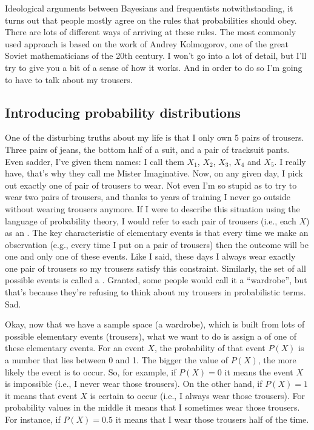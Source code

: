 Ideological arguments between Bayesians and frequentists notwithstanding, it turns out that people mostly agree on the rules that probabilities should obey. There are lots of different ways of arriving at these rules. The most commonly used approach is based on the work of Andrey Kolmogorov, one of the great Soviet mathematicians of the 20th century. I won't go into a lot of detail, but I'll try to give you a bit of a sense of how it works. And in order to do so I'm going to have to talk about my trousers.

\subsection{Introducing probability distributions}

One of the disturbing truths about my life is that I only own 5 pairs of trousers. Three pairs of jeans, the bottom half of a suit, and a pair of tracksuit pants. Even sadder, I've given them names: I call them $X_1$, $X_2$, $X_3$, $X_4$ and $X_5$. I really have, that's why they call me Mister Imaginative. Now, on any given day, I pick out exactly one of pair of trousers to wear. Not even I'm so stupid as to try to wear two pairs of trousers, and thanks to years of training I never go outside without wearing trousers anymore. If I were to describe this situation using the language of probability theory, I would refer to each pair of trousers (i.e., each $X$) as an . The key characteristic of elementary events is that every time we make an observation (e.g., every time I put on a pair of trousers) then the outcome will be one and only one of these events. Like I said, these days I always wear exactly one pair of trousers so my trousers satisfy this constraint. Similarly, the set of all possible events is called a . Granted, some people would call it a ``wardrobe'', but that's because they're refusing to think about my trousers in probabilistic terms. Sad.  

Okay, now that we have a sample space (a wardrobe), which is built from lots of possible elementary events (trousers), what we want to do is assign a  of one of these elementary events. For an event $X$, the probability of that event $P(X)$ is a number that lies between 0 and 1. The bigger the value of $P(X)$, the more likely the event is to occur. So, for example, if $P(X) = 0$ it means the event $X$ is impossible (i.e., I never wear those trousers). On the other hand, if $P(X) = 1$ it means that event $X$ is certain to occur (i.e., I always wear those trousers). For probability values in the middle it means that I sometimes wear those trousers. For instance, if $P(X) = 0.5$ it means that I wear those trousers half of the time. 

